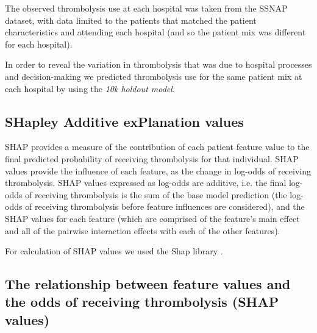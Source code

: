The observed thrombolysis use at each hospital was taken from the SSNAP dataset, with data limited to the patients that matched the patient characteristics and attending each hospital (and so the patient mix was different for each hospital).

In order to reveal the variation in thrombolysis that was due to hospital processes and decision-making we predicted thrombolysis use for the same patient mix at each hospital by using the \emph{10k holdout model}.


\fi
\subsection{SHapley Additive exPlanation values}
SHAP provides a measure of the contribution of each patient feature value to the final predicted probability of receiving thrombolysis for that individual. SHAP values provide the influence of each feature, as the change in log-odds of receiving thrombolysis. SHAP values expressed as log-odds are additive, i.e. the final log-odds of receiving thrombolysis is the sum of the base model prediction (the log-odds of receiving thrombolysis before feature influences are considered), and the SHAP values for each feature (which are comprised of the feature's main effect and all of the pairwise interaction effects with each of the other features). 

For calculation of SHAP values we used the Shap library \cite{lundberg_unified_2017}.

\subsection{The relationship between feature values and the odds of receiving thrombolysis (SHAP values)}

